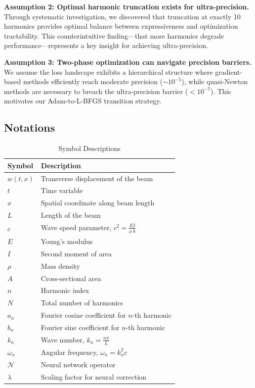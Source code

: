 \textbf{Assumption 2: Optimal harmonic truncation exists for ultra-precision.}
Through systematic investigation, we discovered that truncation at exactly 10 harmonics provides optimal balance between expressiveness and optimization tractability. This counterintuitive finding—that more harmonics degrade performance—represents a key insight for achieving ultra-precision.

\textbf{Assumption 3: Two-phase optimization can navigate precision barriers.}
We assume the loss landscape exhibits a hierarchical structure where gradient-based methods efficiently reach moderate precision ($\sim 10^{-5}$), while quasi-Newton methods are necessary to breach the ultra-precision barrier ($< 10^{-7}$). This motivates our Adam-to-L-BFGS transition strategy.

\subsection{Notations}

\begin{table}[ht]
\centering
\caption{Symbol Descriptions}
\label{tab:symbols}
\begin{tabular}{ll}
\hline
\textbf{Symbol} & \textbf{Description} \\ \hline
$w(t,x)$ & Transverse displacement of the beam \\
$t$ & Time variable \\
$x$ & Spatial coordinate along beam length \\
$L$ & Length of the beam \\
$c$ & Wave speed parameter, $c^2 = \frac{EI}{\rho A}$ \\
$E$ & Young's modulus \\
$I$ & Second moment of area \\
$\rho$ & Mass density \\
$A$ & Cross-sectional area \\
$n$ & Harmonic index \\
$N$ & Total number of harmonics \\
$a_n$ & Fourier cosine coefficient for $n$-th harmonic \\
$b_n$ & Fourier sine coefficient for $n$-th harmonic \\
$k_n$ & Wave number, $k_n = \frac{n\pi}{L}$ \\
$\omega_n$ & Angular frequency, $\omega_n = k_n^2 c$ \\
$\mathcal{N}$ & Neural network operator \\
$\lambda$ & Scaling factor for neural correction \\
\hline
\end{tabular}
\end{table}

